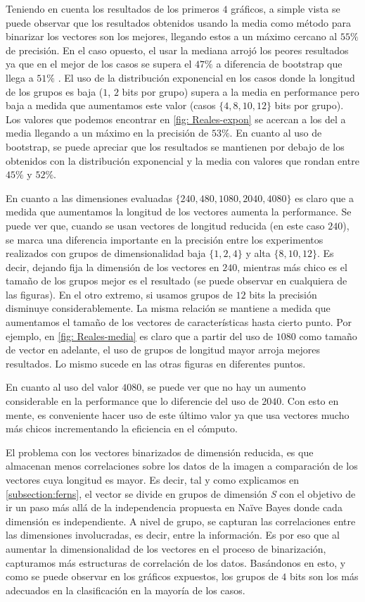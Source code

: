 	Teniendo en cuenta los resultados de los primeros $4$ gráficos, a simple vista se puede observar que los resultados obtenidos usando la media como método para binarizar los vectores son los mejores, llegando estos a un máximo cercano al $55\%$ de precisión. En el caso opuesto, el usar la mediana arrojó los peores resultados ya que en el mejor de los casos se supera el $47\%$ a diferencia de bootstrap que llega a $51\%$ . El uso de la distribución exponencial en los casos donde la longitud de los grupos es baja ($1$, $2$ bits por grupo) supera a la media en performance pero baja a medida que aumentamos este valor (casos $\{ 4, 8, 10, 12\}$ bits por grupo). Los valores que podemos encontrar en \ref{fig: Reales-expon} se acercan a los del a media llegando a un máximo en la precisión de $53\%$. En cuanto al uso de bootstrap, se puede apreciar que los resultados se mantienen por debajo de los obtenidos con la distribución exponencial y la media con valores que rondan entre $45\%$ y $52\%$.

	En cuanto a las dimensiones evaluadas $\{ 240, 480, 1080, 2040, 4080 \}$ es claro que a medida que aumentamos la longitud de los vectores aumenta la performance. Se puede ver que, cuando se usan vectores de longitud reducida (en este caso $240$), se marca una diferencia importante en la precisión entre los experimentos realizados con grupos de dimensionalidad baja $\{ 1, 2, 4 \}$ y alta $\{8, 10, 12\}$. Es decir, dejando fija la dimensión de los vectores en $240$, mientras más chico es el tamaño de los grupos mejor es el resultado (se puede observar en cualquiera de las figuras). En el otro extremo, si usamos grupos de $12$ bits la precisión disminuye considerablemente. La misma relación se mantiene a medida que aumentamos el tamaño de los vectores de características hasta cierto punto. Por ejemplo, en \ref{fig: Reales-media} es claro que a partir del uso de $1080$ como tamaño de vector en adelante, el uso de grupos de longitud mayor arroja mejores resultados. Lo mismo sucede en las otras figuras en diferentes puntos.

	En cuanto al uso del valor $4080$, se puede ver que no hay un aumento considerable en la performance que lo diferencie del uso de $2040$. Con esto en mente, es conveniente hacer uso de este último valor ya que usa vectores mucho más chicos incrementando la eficiencia en el cómputo.

	El problema con los vectores binarizados de dimensión reducida, es que almacenan menos correlaciones sobre los datos de la imagen a comparación de los vectores cuya longitud es mayor. Es decir, tal y como explicamos en \ref{subsection:ferns}, el vector se divide en grupos de dimensión \textit{S} con el objetivo de ir un paso más allá de la independencia propuesta en Na\"{i}ve Bayes donde cada dimensión es independiente. A nivel de grupo, se capturan las correlaciones entre las dimensiones involucradas, es decir, entre la información. Es por eso que al aumentar la dimensionalidad de los vectores en el proceso de binarización, capturamos más estructuras de correlación de los datos. Basándonos en esto, y como se puede observar en los gráficos expuestos, los grupos de $4$ bits son los más adecuados en la clasificación en la mayoría de los casos.

